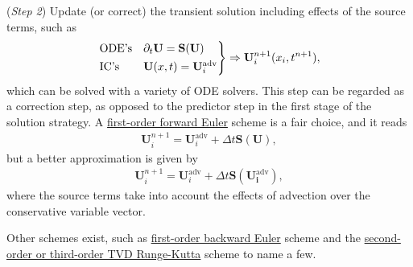 \documentclass[a4paper]{article}
\numberwithin{equation}{section}
\begin{document}
	(\textit{Step 2}) Update (or correct) the transient solution including effects of the source terms, such as 
	\begin{align}
		\label{ODE_system_to_be_soved}
		\begin{rcases}
			\text{ODE's} &\partial_t \mathbf{U} = \mathbf{S(U)}\\
			\text{IC's} &\mathbf{U}(x,t)=\mathbf{U}_i^{\mathrm{adv}}
		\end{rcases} 
		\Rightarrow \mathbf{U}_i^{n+1}(x_i,t^{n+1}),
	\end{align}
	which can be solved with a variety of ODE solvers. This step can be regarded as a correction step, as opposed to the predictor step in the first stage of the solution strategy. A \underline{first-order forward Euler} scheme is a fair choice, and it reads 
	\begin{align}
		\mathbf{U}_i^{n+1} = \mathbf{U}_i^{\mathrm{adv}} + \Delta t \mathbf{S(U)},
	\end{align}
	but a better approximation is given by 
	\begin{align}
		\mathbf{U}_i^{n+1} = \mathbf{U}_i^{\mathrm{adv}} + \Delta t \mathbf{S(\mathbf{U}_i^{\mathrm{adv}})},
	\end{align}
	where the source terms take into account the effects of advection over the conservative variable vector.
	
	Other schemes exist, such as \underline{first-order backward Euler} scheme and the \underline{second-order or third-order TVD Runge-Kutta} scheme to name a few. 
\end{document}
